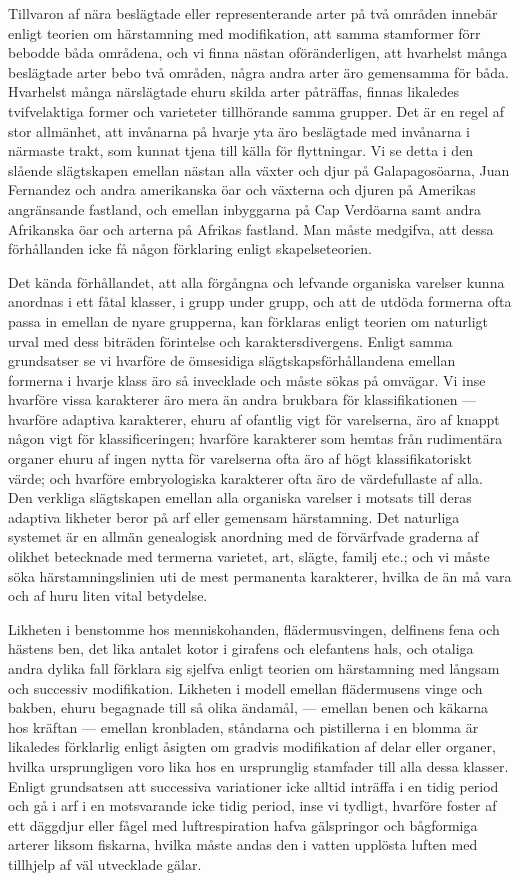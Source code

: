 Tillvaron af nära beslägtade eller representerande arter på två områden innebär enligt teorien om härstamning med modifikation, att samma stamformer förr bebodde båda områdena, och vi finna nästan oföränderligen, att hvarhelst många beslägtade arter bebo två områden, några andra arter äro gemensamma för båda. Hvarhelst många närslägtade ehuru skilda arter påträffas, finnas likaledes tvifvelaktiga former och varieteter tillhörande samma grupper. Det är en regel af stor allmänhet, att invånarna på hvarje yta äro beslägtade med invånarna i närmaste trakt, som kunnat tjena till källa för flyttningar. Vi se detta i den slående slägtskapen emellan nästan alla växter och djur på Galapagosöarna, Juan Fernandez och andra amerikanska öar och växterna och djuren på Amerikas angränsande fastland, och emellan inbyggarna på Cap Verdöarna samt andra Afrikanska öar och arterna på Afrikas fastland. Man måste medgifva, att dessa förhållanden icke få någon förklaring enligt skapelseteorien.

Det kända förhållandet, att alla förgångna och lefvande organiska varelser kunna anordnas i ett fåtal klasser, i grupp under grupp, och att de utdöda formerna ofta passa in emellan de nyare grupperna, kan förklaras enligt teorien om naturligt urval med dess biträden förintelse och karaktersdivergens. Enligt samma grundsatser se vi hvarföre de ömsesidiga slägtskapsförhållandena emellan formerna i hvarje klass äro så invecklade och måste sökas på omvägar. Vi inse hvarföre vissa karakterer äro mera än andra brukbara för klassifikationen — hvarföre adaptiva karakterer, ehuru af ofantlig vigt för varelserna, äro af knappt någon vigt för klassificeringen; hvarföre karakterer som hemtas från rudimentära organer ehuru af ingen nytta för varelserna ofta äro af högt klassifikatoriskt värde; och hvarföre embryologiska karakterer ofta äro de värdefullaste af alla. Den verkliga slägtskapen emellan alla organiska varelser i motsats till deras adaptiva likheter beror på arf eller gemensam härstamning. Det naturliga systemet är en allmän genealogisk anordning med de förvärfvade graderna af olikhet betecknade med termerna varietet, art, slägte, familj etc.; och vi måste söka härstamningslinien uti de mest permanenta karakterer, hvilka de än må vara och af huru liten vital betydelse.

Likheten i benstomme hos menniskohanden, flädermusvingen, delfinens fena och hästens ben, det lika antalet kotor i girafens och elefantens hals, och otaliga andra dylika fall förklara sig sjelfva enligt teorien om härstamning med långsam och successiv modifikation. Likheten i modell emellan flädermusens vinge och bakben, ehuru begagnade till så olika ändamål, — emellan benen och käkarna hos kräftan — emellan kronbladen, ståndarna och pistillerna i en blomma är likaledes förklarlig enligt åsigten om gradvis modifikation af delar eller organer, hvilka ursprungligen voro lika hos en ursprunglig stamfader till alla dessa klasser. Enligt grundsatsen att successiva variationer icke alltid inträffa i en tidig period och gå i arf i en motsvarande icke tidig period, inse vi tydligt, hvarföre foster af ett däggdjur eller fågel med luftrespiration hafva gälspringor och bågformiga arterer liksom fiskarna, hvilka måste andas den i vatten upplösta luften med tillhjelp af väl utvecklade gälar.

